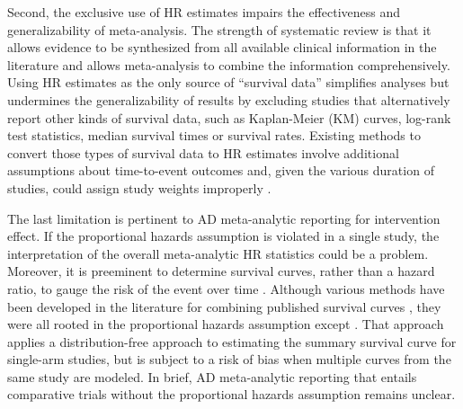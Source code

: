 \documentclass[12pt]{article}
\theoremstyle{mystyle}
\begin{document}
Second, the exclusive use of HR estimates impairs the effectiveness and generalizability of meta-analysis. The strength of systematic review is that it allows evidence to be synthesized from all available clinical information in the literature and allows meta-analysis to combine the information comprehensively.
Using HR estimates as the only source of ``survival data'' 
simplifies analyses but undermines the generalizability of results by excluding studies that alternatively report other kinds of survival data, such as Kaplan-Meier (KM) curves, log-rank test statistics, median survival times or survival rates.
Existing methods to convert those types of survival data to HR estimates involve additional assumptions about time-to-event outcomes \citep{Tudur2001, Tierney2007} and, given the various duration of studies, could assign study weights improperly  \citep{riley2007evidence}.

The last limitation is pertinent to AD meta-analytic reporting for intervention effect. 
If the proportional hazards assumption is violated in a single study, the interpretation of the overall meta-analytic HR statistics could be a problem.
Moreover, it is preeminent to determine survival %
curves, rather than a hazard ratio, 
to gauge the risk of the event over time \citep{pocock2002survival}. 
Although various methods have been developed in the literature for combining published survival curves \citep{begg1989bone,voest1989meta,shore1990meta,reimold1992assessment,hunink1994meta,dear1994iterative,Arends2008}, they were all rooted in the proportional hazards assumption except \cite{combescure2014meta}. That approach applies a distribution-free approach to estimating the summary survival curve for single-arm studies, but  is subject to a risk of bias when multiple curves from the same study are modeled. In brief, AD meta-analytic reporting that entails comparative trials without the proportional hazards assumption remains unclear. 
\end{document}
